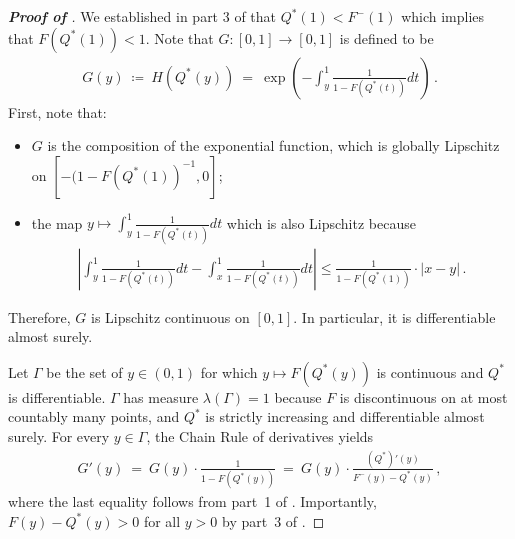 \begin{proof}[\textbf{Proof of }]
    We established in part 3 of   that $Q^*(1) < F^-(1)$ which implies that $F(Q^*(1)) < 1$. Note that $G:[0,1] \to [0,1]$ is defined to be
	\begin{align*}
		G(y)\ \coloneqq\ H( Q^*(y))\ =\ \exp\left(- \int_{y}^1 \frac{1}{1 - F(Q^*(t))} dt \right)\,.
	\end{align*}
	First, note that:
	\begin{itemize}
		\item $G$ is the composition of the exponential function, which is globally Lipschitz on $[-(1 - F(Q^*(1))^{-1}, 0]$;
		\item the map $y \mapsto \int_{y}^1 \frac{1}{1 - F(Q^*(t))} dt$ which is also Lipschitz because
			\begin{align*}
				\left| \int_{y}^1 \frac{1}{1 - F(Q^*(t))} dt - \int_{x}^1 \frac{1}{1 - F(Q^*(t))} dt \right| \leq \frac{1}{1 - F(Q^*(1))} \cdot |x - y|\,.
			\end{align*}
	\end{itemize}
	 Therefore, $G$ is Lipschitz continuous on $[0,1]$. In particular, it is differentiable almost surely. 
	
	Let $\Gamma$ be the set of $y \in (0,1)$ for which $y \mapsto F(Q^*(y))$ is continuous and $Q^*$ is differentiable. $\Gamma$ has measure $\lambda(\Gamma) = 1$ because $F$ is discontinuous on at most countably many points, and $Q^*$ is strictly increasing and differentiable almost surely. For every $y \in \Gamma$, the Chain Rule of derivatives yields
	\begin{align*}
		G'(y)\ =\ G(y) \cdot \frac{1}{1 - F(Q^*(y))}\ =\ G(y) \cdot \frac{(Q^*)'(y)}{F^-(y) - Q^*(y)}\,,
	\end{align*}
	where the last equality follows from part~1 of . Importantly, $F(y) - Q^*(y) > 0$ for all $y > 0$ by part~3 of . 
\end{proof}


